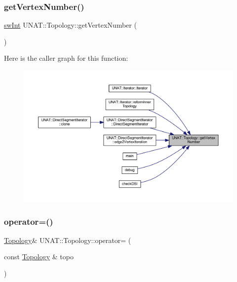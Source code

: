 \mbox{\label{classUNAT_1_1Topology_a7d1d4d508b6e0a44fb0b5f6e6f26a8a5}} 
\subsubsection{\texorpdfstring{getVertexNumber()}{getVertexNumber()}\hspace{0.1cm}{\footnotesize\ttfamily [3/3]}}
{\footnotesize\ttfamily \mbox{\hyperlink{include_2swMacro_8h_a113cf5f6b5377cdf3fac6aa4e443e9aa}{sw\+Int}} U\+N\+A\+T\+::\+Topology\+::get\+Vertex\+Number (\begin{DoxyParamCaption}{ }\end{DoxyParamCaption})}

Here is the caller graph for this function\+:
\nopagebreak
\begin{figure}[H]
\begin{center}
\leavevmode
\includegraphics[width=350pt]{classUNAT_1_1Topology_a7d1d4d508b6e0a44fb0b5f6e6f26a8a5_icgraph}
\end{center}
\end{figure}
\mbox{\label{classUNAT_1_1Topology_a75f1187f0c29f844efb53a30e5ddf737}} 
\subsubsection{\texorpdfstring{operator=()}{operator=()}\hspace{0.1cm}{\footnotesize\ttfamily [1/3]}}
{\footnotesize\ttfamily \mbox{\hyperlink{classUNAT_1_1Topology}{Topology}}\& U\+N\+A\+T\+::\+Topology\+::operator= (\begin{DoxyParamCaption}\item[{const \mbox{\hyperlink{classUNAT_1_1Topology}{Topology}} \&}]{topo }\end{DoxyParamCaption})}

